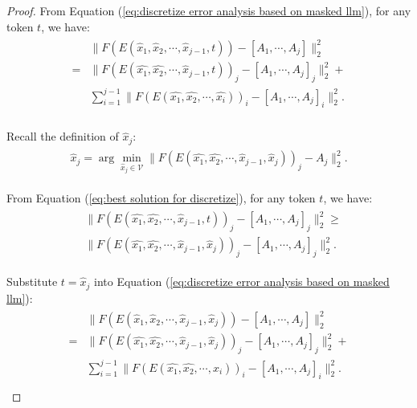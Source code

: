 \begin{proof}
From Equation (\ref{eq:discretize error analysis based on masked llm}), for any token $t$, we have: 
\begin{align}
\label{eq:discretize error analysis based on masked llm}
\begin{aligned}
    &  \| F(E(\hat{x}_1,\hat{x}_2,\cdots,\hat{x}_{j-1},t))-[A_1,\cdots,A_j] \|_2^2 \\
    =& \| F(E(\hat{x_1},\hat{x_2},\cdots,\hat{x}_{j-1},t))_j-[A_1,\cdots,A_j]_j \|_2^2 +\\ 
    &\sum_{i=1}^{j-1} \| F(E(\hat{x_1},\hat{x_2},\cdots,\hat{x_i}))_i-[A_1,\cdots,A_j]_i \|_2^2.\\
\end{aligned}
\end{align}

Recall the definition of $\hat{x}_j$:
\begin{align}
\label{eq:best solution for discretize}
\begin{aligned}
\hat{x}_j=\arg\min_{\hat{x}_j\in \mathcal{V}}\| F(E(\hat{x_1},\hat{x_2},\cdots,\hat{x}_{j-1},\hat{x}_j))_j-A_j \|_2^2 .
\end{aligned}
\end{align}

From Equation (\ref{eq:best solution for discretize}), for any token $t$, we have:\\
\begin{align}
\label{eq:it is better than the nearest}
\begin{aligned}
&\| F(E(\hat{x_1},\hat{x_2},\cdots,\hat{x}_{j-1},t))_j-[A_1,\cdots,A_j]_j \|_2^2 \ge\\
&\| F(E(\hat{x_1},\hat{x_2},\cdots,\hat{x}_{j-1},\hat{x}_j))_j-[A_1,\cdots,A_j]_j\|_2^2.
\end{aligned}
\end{align}

Substitute $t=\hat{x}_j$ into Equation (\ref{eq:discretize error analysis based on masked llm}):\\
\begin{align}
\label{eq:discretize error analysis for two cases}
\begin{aligned}
    &  \| F(E(\hat{x}_1,\hat{x}_2,\cdots,\hat{x}_{j-1},\hat{x}_j))-[A_1,\cdots,A_j] \|_2^2 \\
    =& \| F(E(\hat{x_1},\hat{x_2},\cdots,\hat{x}_{j-1},\hat{x}_j))_j-[A_1,\cdots,A_j]_j \|_2^2 +\\ 
    &\sum_{i=1}^{j-1} \| F(E(\hat{x_1},\hat{x_2},\cdots,\hat{x_i}))_i-[A_1,\cdots,A_j]_i \|_2^2.\\
\end{aligned}
\end{align}


\end{proof}

